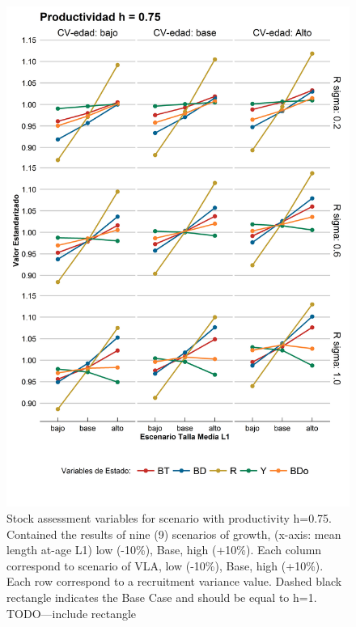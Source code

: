 \documentclass[11pt,letterpaper,]{article}
\begin{document}
\begin{figure}[hbtp]
	\begin{center}
\includegraphics[width=0.70\columnwidth]{figures/steepness-75-estado.png}
  \end{center}
\caption{Stock assessment variables for scenario with productivity h=0.75. Contained the results of nine (9) scenarios of growth, (x-axis: mean length at-age L1) low (-10\%), Base, high (+10\%). Each column correspond to scenario of VLA, low (-10\%), Base, high (+10\%). Each row correspond to a recruitment variance value. Dashed black rectangle indicates the Base Case and should be equal to h=1. TODO---include rectangle}
\label{figure1}
\end{figure}
\end{document}
